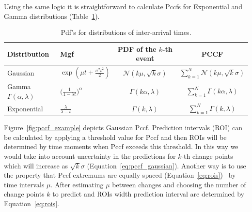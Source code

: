 \documentclass[doctoral,utf8,lot,loar,lof,shortloft,index]{jydiss}
\begin{document}
Using the same logic it is straightforward to calculate Pccfs for Exponential and Gamma distributions (Table~\ref{table:pccfs}).
\begin{table}[!htb] \caption{Pdf's for distributions of inter-arrival times.}\label{table:pccfs}
	\begin{center}
		\begin{tabular}{|l|l|c|c|}
			\hline
			Distribution & Mgf & PDF of the $k$-th event & PCCF  \\[5pt]
			\hline
			Gaussian & $\exp{ (\mu t + \frac{\sigma^2 t^2}{2}) }$ & $\mathcal{N}(k \mu, \sqrt{k} \sigma)$ & $\sum_{k=1}^N \mathcal{N}(k \mu, \sqrt{k} \sigma)$ \\
			Gamma $\Gamma(\alpha, \lambda)$ & $\Big ( \frac{1}{1- \lambda t} \Big )^{\alpha}$ & $\Gamma(k \alpha, \lambda)$ & $\sum_{k=1}^N \Gamma(k \alpha, \lambda)$\\
			Exponential & $\frac{\lambda}{\lambda - t}$ & $\Gamma(k, \lambda)$ & $\sum_{k=1}^N \Gamma(k, \lambda)$\\
			\hline
		\end{tabular}
	\end{center}
\end{table}
Figure~\ref{fig:pccf_example} depicts Gaussian Pccf.
Prediction intervals (ROI) can be calculated by applying a threshold value for Pccf and then ROIs will be determined by time moments when Pccf exceeds this threshold.
In this way we would take into account uncertainty in the predictions for $k$-th change points which will increase as $\sqrt{k} \sigma$ (Equation~\ref{eq:pccf_gaussian}).
Another way is to use the property that Pccf extremums are equally spaced (Equation~\ref{eq:rois})~\cite{MaslovSDM2016} by time intervals $\mu$.
After estimating $\mu$ between changes and choosing the number of change points $k$ to predict and ROIs width prediction interval are determined by Equation~\ref{eq:rois}.
\end{document}
